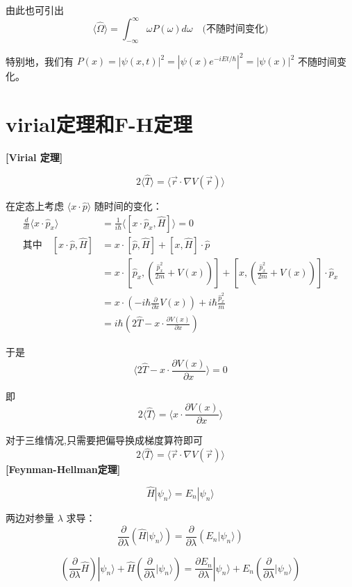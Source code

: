\documentclass[lang=cn,10pt]{elegantbook}
\begin{document}
\begin{enumerate}
	由此也可引出
	\[
	\langle \hat{\Omega} \rangle = \int_{-\infty}^{\infty} \omega P(\omega) d\omega \quad \text{(不随时间变化)}
	\]
	
	特别地，我们有 $P(x) = |\psi(x,t)|^2 = |\psi(x) e^{-iEt/\hbar}|^2 = |\psi(x)|^2$ 不随时间变化。
\end{enumerate}
\section{virial定理和F-H定理}

\textbf{[Virial 定理]}

\[ 2 \langle \hat{T} \rangle = \langle \vec{r} \cdot \nabla V(\vec{r}) \rangle \]

在定态上考虑 \(\langle x \cdot \hat{p} \rangle\) 随时间的变化：
\begin{align*}
		\frac{d}{dt} \langle x \cdot \hat{p}_x \rangle &= \frac{1}{i\hbar} \langle [x \cdot \hat{p}_x, \hat{H}] \rangle = 0 \\
		\text{其中} \quad [x \cdot \hat{p}, \hat{H}] &= x \cdot [\hat{p}, \hat{H}] + [x, \hat{H}] \cdot \hat{p} \\
		&= x \cdot \left[ \hat{p}_x, \left( \frac{\hat{p}_x^2}{2m} + V(x) \right) \right] + \left[ x, \left( \frac{\hat{p}_x^2}{2m} + V(x) \right) \right] \cdot \hat{p}_x \\
	&= x \cdot \left( -i\hbar \frac{\partial}{\partial x} V(x) \right) + i\hbar \frac{\hat{p}_x^2}{m} \\
	&= i\hbar \left( 2 \hat{T} - x \cdot \frac{\partial V(x)}{\partial x} \right)
\end{align*}

于是
\[ \langle 2 \hat{T} - x \cdot \frac{\partial V(x)}{\partial x} \rangle = 0 \]

即
\[ 2 \langle \hat{T} \rangle = \langle x \cdot \frac{\partial V(x)}{\partial x} \rangle \]

	对于三维情况,只需要把偏导换成梯度算符即可
	\[2\langle \hat{T}\rangle =\langle \vec{r}\cdot \nabla V(\vec{r})\rangle \]
\textbf{[Feynman-Hellman定理]}

\[
\hat{H} |\psi_n\rangle = E_n |\psi_n\rangle
\]

两边对参量 \(\lambda\) 求导：
\[
\frac{\partial}{\partial \lambda} (\hat{H} |\psi_n\rangle) = \frac{\partial}{\partial \lambda} (E_n |\psi_n\rangle)
\]

\[
\left( \frac{\partial}{\partial \lambda} \hat{H} \right) |\psi_n\rangle + \hat{H} \left( \frac{\partial}{\partial \lambda} |\psi_n\rangle \right) = \frac{\partial E_n}{\partial \lambda} |\psi_n\rangle + E_n \left( \frac{\partial}{\partial \lambda} |\psi_n\rangle \right)
\]
\end{document}

